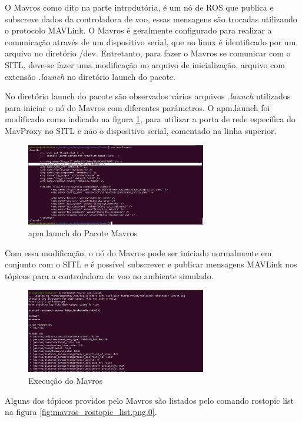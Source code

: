 \documentclass[12pt,a4paper,oneside]{book}
\begin{document}
O Mavros como dito na parte introdutória, é um nó de ROS que publica e subscreve dados da controladora de voo, essas mensagens são trocadas utilizando o protocolo MAVLink. O Mavros é geralmente configurado para realizar a comunicação através de um dispositivo serial, que no linux é identificado por um arquivo no diretório /dev. Entretanto, para fazer o Mavros se comunicar com o SITL, deve-se fazer uma modificação no arquivo de inicialização, arquivo com extensão \textit{.launch} no diretório launch do pacote.

No diretório launch do pacote são observados vários arquivos \textit{.launch} utilizados para iniciar o nó do Mavros com diferentes parâmetros. O apm.launch foi modificado como indicado na figura \ref{fig:mavros_launch.png.0}, para utilizar a porta de rede específica do MavProxy no SITL e não o dispositivo serial, comentado na linha superior.
%
\begin{figure}[H]
  \centering
  \includegraphics[width=0.7\textwidth]{Images/Desenvolvimento/mavros_launch.png}
  \caption{apm.launch do Pacote Mavros}
  \label{fig:mavros_launch.png.0}
\end{figure}
%
Com essa modificação, o nó do Mavros pode ser iniciado normalmente em conjunto com o SITL e é possível subscrever e publicar mensagens MAVLink nos tópicos para a controladora de voo no ambiente simulado. 
%
\begin{figure}[H]
  \centering
  \includegraphics[width=0.7\textwidth]{Images/Desenvolvimento/mavros_execution.png}
  \caption{Execução do Mavros}
  \label{fig:mavros_execution.png.0}
\end{figure}
%
Alguns dos tópicos providos pelo Mavros são listados pelo comando rostopic list na figura \ref{fig:mavros_rostopic_list.png.0}. 
\end{document}
